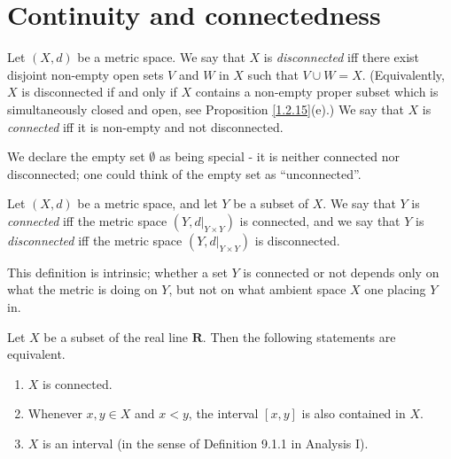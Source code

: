 \section{Continuity and connectedness}\label{sec 2.4}

\begin{definition}\label{2.4.1}
    Let \((X, d)\) be a metric space.
    We say that \(X\) is \emph{disconnected} iff there exist disjoint non-empty open sets \(V\) and \(W\) in \(X\) such that \(V \cup W = X\).
    (Equivalently, \(X\) is disconnected if and only if \(X\) contains a non-empty proper subset which is simultaneously closed and open, see Proposition \ref{1.2.15}(e).)
    We say that \(X\) is \emph{connected} iff it is non-empty and not disconnected.
\end{definition}

\begin{note}
    We declare the empty set \(\emptyset\) as being special
    - it is neither connected nor disconnected;
    one could think of the empty set as ``unconnected''.
\end{note}

\setcounter{theorem}{2}
\begin{definition}\label{2.4.3}
    Let \((X, d)\) be a metric space, and let \(Y\) be a subset of \(X\).
    We say that \(Y\) is \emph{connected} iff the metric space \((Y, d|_{Y \times Y})\) is connected, and we say that \(Y\) is \emph{disconnected} iff the metric space \((Y, d|_{Y \times Y})\) is disconnected.
\end{definition}

\begin{remark}\label{2.4.4}
    This definition is intrinsic;
    whether a set \(Y\) is connected or not depends only on what the metric is doing on \(Y\), but not on what ambient space \(X\) one placing \(Y\) in.
\end{remark}

\begin{theorem}\label{2.4.5}
    Let \(X\) be a subset of the real line \(\mathbf{R}\).
    Then the following statements are equivalent.
    \begin{enumerate}
        \item \(X\) is connected.
        \item Whenever \(x, y \in X\) and \(x < y\), the interval \([x, y]\) is also contained in \(X\).
        \item \(X\) is an interval (in the sense of Definition 9.1.1 in Analysis I).
    \end{enumerate}
\end{theorem}

